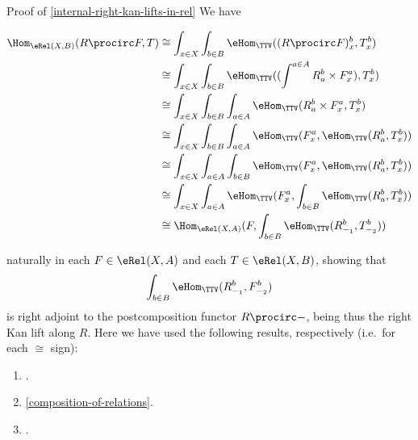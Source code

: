 \begin{Proof}{Proof of \cref{internal-right-kan-lifts-in-rel}}%
    We have
    \begin{envsmallsize}
        \begin{align*}
            \Hom_{\eRel(X,B)}(R\procirc F,T) &\cong  \int_{x\in X}\int_{b\in B}\eHom_{\TTV}((R\procirc F)^{b}_{x},T^{b}_{x})\\
                                             &\cong  \int_{x\in X}\int_{b\in B}\eHom_{\TTV}((\int^{a\in A}R^{b}_{a}\times F^{a}_{x}),T^{b}_{x})\\
                                             &\cong  \int_{x\in X}\int_{b\in B}\int_{a\in A}\eHom_{\TTV}(R^{b}_{a}\times F^{a}_{x},T^{b}_{x})\\
                                             &\cong  \int_{x\in X}\int_{b\in B}\int_{a\in A}\eHom_{\TTV}(F^{a}_{x},\eHom_{\TTV}(R^{b}_{a},T^{b}_{x}))\\
                                             &\cong  \int_{x\in X}\int_{a\in A}\int_{b\in B}\eHom_{\TTV}(F^{a}_{x},\eHom_{\TTV}(R^{b}_{a},T^{b}_{x}))\\
                                             &\cong  \int_{x\in X}\int_{a\in A}\eHom_{\TTV}(F^{a}_{x},\int_{b\in B}\eHom_{\TTV}(R^{b}_{a},T^{b}_{x}))\\
                                             &\cong  \Hom_{\eRel(X,A)}(F,\int_{b\in B}\eHom_{\TTV}(R^{b}_{-_{1}},T^{b}_{-_{2}}))%
        \end{align*}
    \end{envsmallsize}
    naturally in each $F\in\eRel(X,A)$ and each $T\in\eRel(X,B)$, showing that
    \[
        \int_{b\in B}\eHom_{\TTV}(R^{b}_{-_{1}},F^{b}_{-_{2}})%
    \]%
    is right adjoint to the postcomposition functor $R\procirc-$, being thus the right Kan lift along $R$. Here we have used the following results, respectively (i.e.\ for each $\cong$ sign):
    \begin{enumerate}
        \item\label{proof-of-existence-of-right-kan-lifts-in-rel-1}.
        \item\label{proof-of-existence-of-right-kan-lifts-in-rel-2}\cref{composition-of-relations}.
        \item\label{proof-of-existence-of-right-kan-lifts-in-rel-3}.

\end{enumerate}
\end{Proof}
